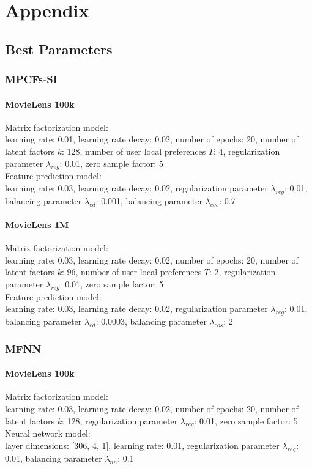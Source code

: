 \chapter{Appendix}
\label{a:appendix}

\section{Best Parameters}
\subsection{MPCFs-SI}
\subsubsection{MovieLens 100k}
Matrix factorization model:\\
learning rate: 0.01, learning rate decay: 0.02, number of epochs: 20, number of latent factors $k$: 128, number of user local preferences $T$: 4, regularization parameter $\lambda_{reg}$: 0.01, zero sample factor: 5\\
Feature prediction model:\\
learning rate: 0.03, learning rate decay: 0.02, regularization parameter $\lambda_{reg}$: 0.01, balancing parameter $\lambda_{ed}$: 0.001, balancing parameter $\lambda_{cos}$: 0.7

\subsubsection{MovieLens 1M}
Matrix factorization model:\\
learning rate: 0.03, learning rate decay: 0.02, number of epochs: 20, number of latent factors $k$: 96, number of user local preferences $T$: 2, regularization parameter $\lambda_{reg}$: 0.01, zero sample factor: 5\\
Feature prediction model:\\
learning rate: 0.03, learning rate decay: 0.02, regularization parameter $\lambda_{reg}$: 0.01, balancing parameter $\lambda_{ed}$: 0.0003, balancing parameter $\lambda_{cos}$: 2

\subsection{MFNN}
\subsubsection{MovieLens 100k}
Matrix factorization model:\\
learning rate: 0.03, learning rate decay: 0.02, number of epochs: 20, number of latent factors $k$: 128, regularization parameter $\lambda_{reg}$: 0.01, zero sample factor: 5
Neural network model:\\
layer dimensions: [306, 4, 1], learning rate: 0.01, regularization parameter $\lambda_{reg}$: 0.01, balancing parameter $\lambda_{nn}$: 0.1


